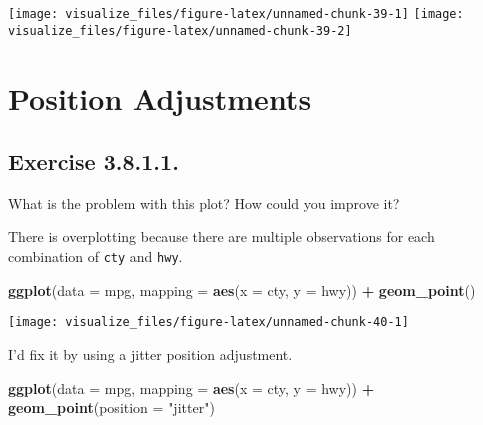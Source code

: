 \documentclass[]{book}
\newenvironment{Shaded}{\begin{snugshade}}{\end{snugshade}}
\newcommand{\DataTypeTok}[1]{\textcolor[rgb]{0.13,0.29,0.53}{#1}}
\newcommand{\KeywordTok}[1]{\textcolor[rgb]{0.13,0.29,0.53}{\textbf{#1}}}
\newcommand{\NormalTok}[1]{#1}
\newcommand{\OperatorTok}[1]{\textcolor[rgb]{0.81,0.36,0.00}{\textbf{#1}}}
\newcommand{\StringTok}[1]{\textcolor[rgb]{0.31,0.60,0.02}{#1}}
\theoremstyle{plain}
\theoremstyle{remark}
\begin{document}
\begin{center}\texttt{[image: visualize\_files/figure-latex/unnamed-chunk-39-1]} \texttt{[image: visualize\_files/figure-latex/unnamed-chunk-39-2]} \end{center}

\hypertarget{position-adjustments}{%
\section{Position Adjustments}\label{position-adjustments}}

\hypertarget{exercise-3.8.1.1.}{%
\subsection*{\texorpdfstring{Exercise
{3.8.1.1}.}{Exercise 3.8.1.1.}}\label{exercise-3.8.1.1.}}

What is the problem with this plot? How could you improve it?

There is overplotting because there are multiple observations for each
combination of \texttt{cty} and \texttt{hwy}.

\begin{Shaded}
\begin{Highlighting}[]
\KeywordTok{ggplot}\NormalTok{(}\DataTypeTok{data =}\NormalTok{ mpg, }\DataTypeTok{mapping =} \KeywordTok{aes}\NormalTok{(}\DataTypeTok{x =}\NormalTok{ cty, }\DataTypeTok{y =}\NormalTok{ hwy)) }\OperatorTok{+}
\StringTok{  }\KeywordTok{geom_point}\NormalTok{()}
\end{Highlighting}
\end{Shaded}

\begin{center}\texttt{[image: visualize\_files/figure-latex/unnamed-chunk-40-1]} \end{center}

I'd fix it by using a jitter position adjustment.

\begin{Shaded}
\begin{Highlighting}[]
\KeywordTok{ggplot}\NormalTok{(}\DataTypeTok{data =}\NormalTok{ mpg, }\DataTypeTok{mapping =} \KeywordTok{aes}\NormalTok{(}\DataTypeTok{x =}\NormalTok{ cty, }\DataTypeTok{y =}\NormalTok{ hwy)) }\OperatorTok{+}
\StringTok{  }\KeywordTok{geom_point}\NormalTok{(}\DataTypeTok{position =} \StringTok{"jitter"}\NormalTok{)}
\end{Highlighting}
\end{Shaded}
\end{document}

